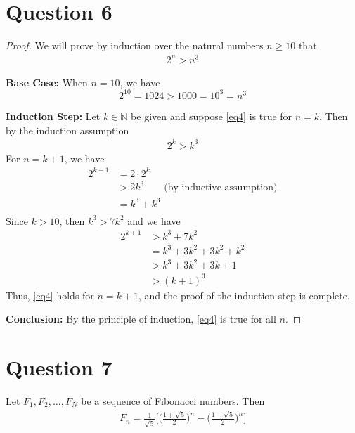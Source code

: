 \documentclass[11pt, oneside]{article}   	%
\begin{document}
\section*{Question 6}
\begin{proof}
We will prove by induction over the natural numbers $n \geq 10$ that
\begin{align}
	2^n > n^3
	\label{eq4}
\end{align}

\textbf{Base Case:} When $n=10$, we have
$$2^{10} = 1024 > 1000 = 10^3 = n^3$$

\textbf{Induction Step:} Let $k \in \mathbb{N}$ be given and suppose \eqref{eq4} is true for $n=k$. Then by the induction assumption
\begin{align*}
	2^k > k^3
\end{align*}
For $n=k+1$, we have
\begin{align*}
	2^{k+1} & = 2 \cdot 2^k\\
	& > 2k^3 \qquad \text{(by inductive assumption)} \\
	& = k^3 + k^3 \\
\end{align*}
Since $k>10$, then $k^3 > 7k^2$ and we have
\begin{align*}
	2^{k+1} & > k^3 + 7k^2 \\
	& = k^3 + 3k^2 + 3k^2 + k^2 \\
	& > k^3 + 3k^2 + 3k + 1 \\
	& > (k+1)^3
\end{align*}
Thus, \eqref{eq4} holds for $n=k+1$, and the proof of the induction step is complete.

\textbf{Conclusion:} By the principle of induction, \eqref{eq4} is true for all $n$.
\end{proof}




\section*{Question 7}

Let $F_1, F_2, \ldots, F_N$ be a sequence of Fibonacci numbers. Then
\begin{align}
	F_n = \frac{1}{\sqrt{5}} \Big[\Big(\frac{1+\sqrt{5}}{2}\Big)^n - \Big(\frac{1-\sqrt{5}}{2}\Big)^n \Big]
	\label{eq5}
\end{align}
\end{document}
